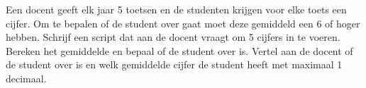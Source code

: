 Een docent geeft elk jaar 5 toetsen en de studenten krijgen voor elke toets een cijfer. Om te bepalen of de student over gaat moet deze gemiddeld een 6 of hoger hebben. Schrijf een script dat aan de docent vraagt om 5 cijfers in te voeren. Bereken het gemiddelde en bepaal of de student over is. Vertel aan de docent of de student over is en welk gemiddelde cijfer de student heeft met maximaal 1 decimaal.


